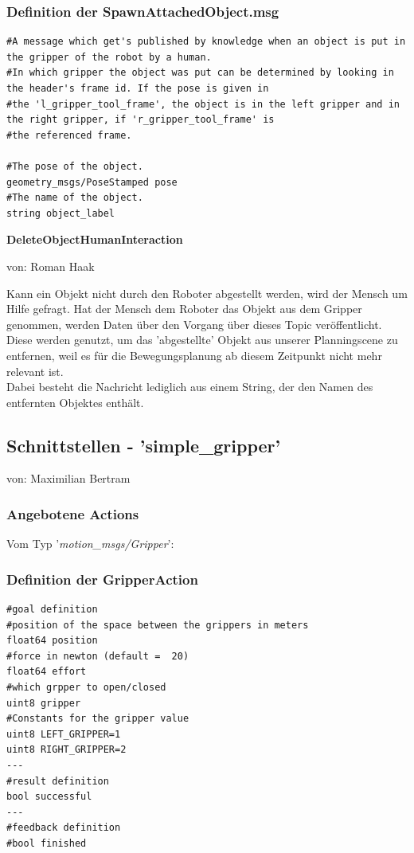 \documentclass{suturo}
\makeatletter
\newcommand{\chapterauthor}[1]{%
  {\parindent0pt\vspace*{-27pt}%
  \linespread{0}\small\begin{flushright}von: #1\end{flushright}%
  \par\nobreak\vspace*{0pt}}
  \@afterheading%
}
\makeatother
\begin{document}
\subsubsection*{Definition der SpawnAttachedObject.msg}
\begin{verbatim}
#A message which get's published by knowledge when an object is put in the gripper of the robot by a human.
#In which gripper the object was put can be determined by looking in the header's frame id. If the pose is given in 
#the 'l_gripper_tool_frame', the object is in the left gripper and in the right gripper, if 'r_gripper_tool_frame' is
#the referenced frame.

#The pose of the object. 
geometry_msgs/PoseStamped pose
#The name of the object.
string object_label
\end{verbatim}



\textbf{DeleteObjectHumanInteraction}
\chapterauthor{Roman Haak}

Kann ein Objekt nicht durch den Roboter abgestellt werden, wird der Mensch um Hilfe gefragt. Hat der Mensch dem Roboter das Objekt aus dem Gripper genommen, werden Daten über den Vorgang über dieses Topic veröffentlicht. Diese werden genutzt, um das 'abgestellte' Objekt aus unserer Planningscene zu entfernen, weil es für die Bewegungsplanung ab diesem Zeitpunkt nicht mehr relevant ist.\\ Dabei besteht die Nachricht lediglich aus einem String, der den Namen des entfernten Objektes enthält.




\subsection{Schnittstellen - 'simple\_gripper'}
\chapterauthor{Maximilian Bertram}
\subsubsection{Angebotene Actions}
Vom Typ '\textit{motion\_msgs/Gripper}': \\
\subsubsection*{Definition der GripperAction}
\begin{verbatim}
#goal definition
#position of the space between the grippers in meters
float64 position
#force in newton (default =  20)
float64 effort
#which grpper to open/closed
uint8 gripper
#Constants for the gripper value
uint8 LEFT_GRIPPER=1
uint8 RIGHT_GRIPPER=2
---
#result definition
bool successful
---
#feedback definition
#bool finished
\end{verbatim}
\end{document}
